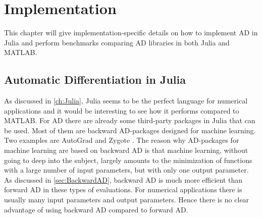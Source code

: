 \chapter{Implementation}
\label{ch:Implementation}
This chapter will give implementation-specific details on how to implement AD in Julia and perform benchmarks comparing AD libraries in both Julia and MATLAB.

\section{Automatic Differentiation in Julia}
\label{sec:ADInJulia}
As discussed in \autoref{ch:Julia}, Julia seems to be the perfect language for numerical applications and it would be interesting to see how it performs compared to MATLAB. For AD there are already some third-party packages in Julia that can be used. Most of them are backward AD-packages designed for machine learning. Two examples are AutoGrad \citep{knet2016mlsys} and Zygote \citep{innes2018don}. The reason why AD-packages for machine learning are based on backward AD is that machine learning, without going to deep into the subject, largely amounts to the minimization of functions with a large number of input parameters, but with only one output parameter. As discussed in \autoref{sec:BackwardAD}, backward AD is much more efficient than forward AD in these types of evaluations. For numerical applications there is usually many input parameters and output parameters. Hence there is no clear advantage of using backward AD compared to forward AD. 

